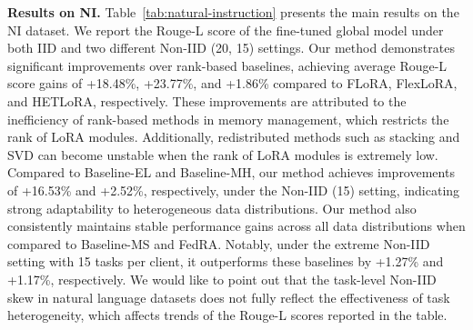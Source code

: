 \documentclass[sigconf]{acmart}
\begin{document}
\textbf{Results on NI.} Table~\ref{tab:natural-instruction} presents the main results on the NI dataset. We report the Rouge-L score of the fine-tuned global model under both IID and two different Non-IID (20, 15) settings. 
%
Our method demonstrates significant improvements over rank-based baselines, achieving average Rouge-L score gains of +18.48\%, +23.77\%, and +1.86\% compared to FLoRA, FlexLoRA, and HETLoRA, respectively. These improvements are attributed to the inefficiency of rank-based methods in memory management, which restricts the rank of LoRA modules. Additionally, redistributed methods such as stacking and SVD can become unstable when the rank of LoRA modules is extremely low.
Compared to Baseline-EL and Baseline-MH, our method achieves improvements of +16.53\% and +2.52\%, respectively, under the Non-IID (15) setting, indicating strong adaptability to heterogeneous data distributions.
Our method also consistently maintains stable performance gains across all data distributions when compared to Baseline-MS and FedRA. Notably, under the extreme Non-IID setting with 15 tasks per client, it outperforms these baselines by +1.27\% and +1.17\%, respectively.
We would like to point out that the task-level Non-IID skew in natural language datasets does not fully reflect the effectiveness of task heterogeneity, which affects trends of the Rouge-L scores reported in the table.
%


\end{document}
